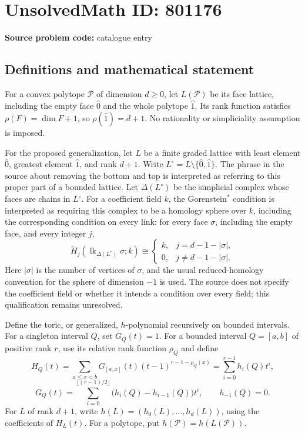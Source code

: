 \documentclass[11pt]{article}
\begin{document}
\section*{UnsolvedMath ID: 801176}
\textbf{Source problem code:} catalogue entry
\subsection{Definitions and mathematical statement}
For a convex polytope \(\mathcal P\) of dimension \(d\geq 0\), let \(L(\mathcal P)\) be its face lattice, including the empty face \(\hat 0\) and the whole polytope \(\hat 1\). Its rank function satisfies \(\rho(F)=\dim F+1\), so \(\rho(\hat 1)=d+1\). No rationality or simpliciality assumption is imposed.

For the proposed generalization, let \(L\) be a finite graded lattice with least element \(\hat 0\), greatest element \(\hat 1\), and rank \(d+1\). Write \(L^\circ=L\setminus\{\hat 0,\hat 1\}\). The phrase in the source about removing the bottom and top is interpreted as referring to this proper part of a bounded lattice. Let \(\Delta(L^\circ)\) be the simplicial complex whose faces are chains in \(L^\circ\). For a coefficient field \(k\), the Gorenstein\(^*\) condition is interpreted as requiring this complex to be a homology sphere over \(k\), including the corresponding condition on every link: for every face \(\sigma\), including the empty face, and every integer \(j\),
\[
\widetilde H_j\!\left(\operatorname{lk}_{\Delta(L^\circ)}\sigma;k\right)
\cong
\begin{cases}
k,&j=d-1-|\sigma|,\\
0,&j\ne d-1-|\sigma|.
\end{cases}
\]
Here \(|\sigma|\) is the number of vertices of \(\sigma\), and the usual reduced-homology convention for the sphere of dimension \(-1\) is used. The source does not specify the coefficient field or whether it intends a condition over every field; this qualification remains unresolved.

Define the toric, or generalized, \(h\)-polynomial recursively on bounded intervals. For a singleton interval \(Q\), set \(G_Q(t)=1\). For a bounded interval \(Q=[a,b]\) of positive rank \(r\), use its relative rank function \(\rho_Q\) and define
\[
H_Q(t)=\sum_{a\leq x<b}G_{[a,x]}(t)(t-1)^{r-1-\rho_Q(x)}
       =\sum_{i=0}^{r-1}h_i(Q)t^i,
\]
\[
G_Q(t)=\sum_{i=0}^{\lfloor(r-1)/2\rfloor}
\bigl(h_i(Q)-h_{i-1}(Q)\bigr)t^i,
\qquad h_{-1}(Q)=0.
\]
For \(L\) of rank \(d+1\), write \(h(L)=(h_0(L),\ldots,h_d(L))\), using the coefficients of \(H_L(t)\). For a polytope, put \(h(\mathcal P)=h(L(\mathcal P))\).
\end{document}
